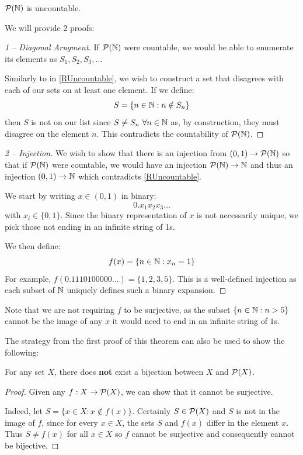 \documentclass[../main.tex]{subfiles}
\begin{document}
\begin{theorem}
  $\mathcal{P}(\mathbb{N})$ is uncountable.
  \label{powerSetUncountable}
\end{theorem}
We will provide 2 proofs:
\begin{proof}[1 -- Diagonal Arugment]
  If $\mathcal{P}(\mathbb{N})$ were countable, we would be able to enumerate its elements as $S_1, S_2, S_3, \ldots$

  Similarly to in \cref{RUncountable}, we wish to construct a set that disagrees with each of our sets on at least one element.
  If we define:
  \[
    S = \{n \in \mathbb{N}: n \notin S_n\}
  \]
  then $S$ is not on our list since $S \neq S_n\ \forall n \in \mathbb{N}$ as, by construction, they must disagree on the element $n$.
  This contradicts the countability of $\mathcal{P}(\mathbb{N})$.
\end{proof}
\begin{proof}[2 -- Injection]
  We wish to show that there is an injection from $(0, 1) \to \mathcal{P}(\mathbb{N})$ so that if $\mathcal{P}(\mathbb{N})$ were countable, we would have an injection $\mathcal{P}(\mathbb{N}) \to \mathbb{N}$ and thus an injection $(0, 1) \to \mathbb{N}$ which contradicts \cref{RUncountable}.

  We start by writing $x \in (0, 1)$ in binary:
  \[
    0.x_1x_2x_3\ldots
  \]
  with $x_i \in \{0, 1\}$.
  Since the binary representation of $x$ is not necessarily unique, we pick those not ending in an infinite string of 1s.

  We then define:
  \[
    f(x) = \{n \in \mathbb{N}: x_n = 1\}
  \]
  For example, $f(0.1110100000\ldots) = \{1, 2, 3, 5\}$.
  This is a well-defined injection as each subset of $\mathbb{N}$ uniquely defines such a binary expansion.
\end{proof}
\begin{remark}
  Note that we are not requiring $f$ to be surjective, as the subset $\{n \in \mathbb{N}: n > 5\}$ cannot be the image of any $x$ it would need to end in an infinite string of $1$s.
\end{remark}
The strategy from the first proof of this theorem can also be used to show the following:
\begin{theorem}
  For any set $X$, there does \textbf{not} exist a bijection between $X$ and $\mathcal{P}(X)$.
\end{theorem}
\begin{proof}
  Given any $f: X \to \mathcal{P}(X)$, we can show that it cannot be surjective.

  Indeed, let $S = \{x \in X: x \notin f(x)\}$.
  Certainly $S \in \mathcal{P}(X)$ and $S$ is not in the image of $f$, since for every $x \in X$, the sets $S$ and $f(x)$ differ in the element $x$.
  Thus $S \neq f(x)$ for all $x \in X$ so $f$ cannot be surjective and consequently cannot be  bijective.
\end{proof}
\end{document}
